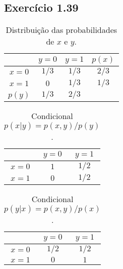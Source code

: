 \documentclass{article}
\begin{document}
\subsection{ Exerc\'icio 1.39}


  \begin{table}[ht]
  	\centering %
  	\caption{Distribuição das probabilidades de $x$ e $y$.}
  	\label{prob}
  	\begin{tabular}{cccc} %
  		\toprule %
  		             &      $y=0$       &  $y=1$   &   $p(x)$ \\ %
  		\midrule %
  		      $x=0$   &    $1/3$       &   $1/3$   &   $2/3$   \\ %
  	          $x=1$   &    $0$         &   $1/3$   &   $1/3$   \\ %
  	     \midrule
  	         $p(y)$   &     $1/3$      &    $2/3$     &         \\ %
  	    \bottomrule  %
  	\end{tabular}
  \end{table}


  \begin{table}[ht]
  	\centering %
  	\caption{Condicional $p(x|y) = p(x,y)/p(y)$.}
  	\label{cond1}
  	\begin{tabular}{ccc} %
  		\toprule %
  	        	&      $y=0$       &  $y=1$   \\ %
  		\midrule %
  		$x=0$   &    $1$       &   $1/2$     \\ %
  		$x=1$   &    $0$         & $1/2$     \\ %
  		\bottomrule  %
  	\end{tabular}
  \end{table}

  \begin{table}[ht]
  	\centering %
  	\caption{Condicional $p(y|x) = p(x,y)/p(x)$.}
  	\label{cond1}
  	\begin{tabular}{ccc} %
  		\toprule %
  		&      $y=0$       &  $y=1$   \\ %
  		\midrule %
  		$x=0$   &    $1/2$       &   $1/2$     \\ %
  		$x=1$   &    $0$         &    $1$     \\ %
  		\bottomrule  %
  	\end{tabular}
  \end{table}
  
\end{document}
